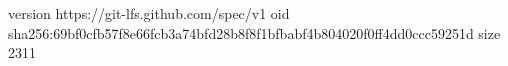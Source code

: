 version https://git-lfs.github.com/spec/v1
oid sha256:69bf0cfb57f8e66fcb3a74bfd28b8f8f1bfbabf4b804020f0ff4dd0ccc59251d
size 2311
